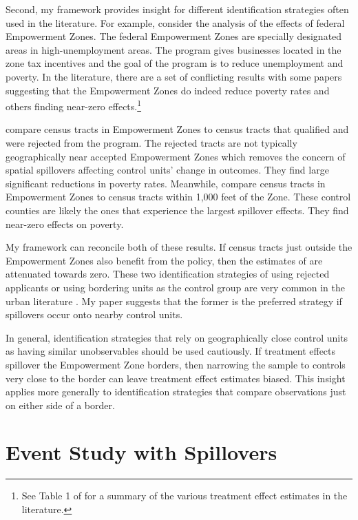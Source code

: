 \documentclass[11pt]{article}
\begin{document}
Second, my framework provides insight for different identification strategies often used in the literature. For example, consider the analysis of the effects of federal Empowerment Zones. The federal Empowerment Zones are specially designated areas in high-unemployment areas. The program gives businesses located in the zone tax incentives and the goal of the program is to reduce unemployment and poverty. In the literature, there are a set of conflicting results with some papers suggesting that the Empowerment Zones do indeed reduce poverty rates and others finding near-zero effects.\footnote{See Table 1 of \citet{Neumark_Young_2019} for a summary of the various treatment effect estimates in the literature.} 

\citet{Busso_Gregory_Kline_2013} compare census tracts in Empowerment Zones to census tracts that qualified and were rejected from the program. The rejected tracts are not typically geographically near accepted Empowerment Zones which removes the concern of spatial spillovers affecting control units' change in outcomes. They find large significant reductions in poverty rates. Meanwhile, \citet{Neumark_Kolko_2010} compare census tracts in Empowerment Zones to census tracts within 1,000 feet of the Zone. These control counties are likely the ones that experience the largest spillover effects. They find near-zero effects on poverty. 

My framework can reconcile both of these results. If census tracts just outside the Empowerment Zones also benefit from the policy, then the estimates of \citet{Neumark_Kolko_2010} are attenuated towards zero. These two identification strategies of using rejected applicants or using bordering units as the control group are very common in the urban literature \citep{Baum-Snow_Ferreira_2015}. My paper suggests that the former is the preferred strategy if spillovers occur onto nearby control units. 

In general, identification strategies that rely on geographically close control units as having similar unobservables should be used cautiously. If treatment effects spillover the Empowerment Zone borders, then narrowing the sample to controls very close to the border can leave treatment effect estimates biased. This insight applies more generally to identification strategies that compare observations just on either side of a border.



\section{Event Study with Spillovers}
\label{sec:event_study}
\end{document}

